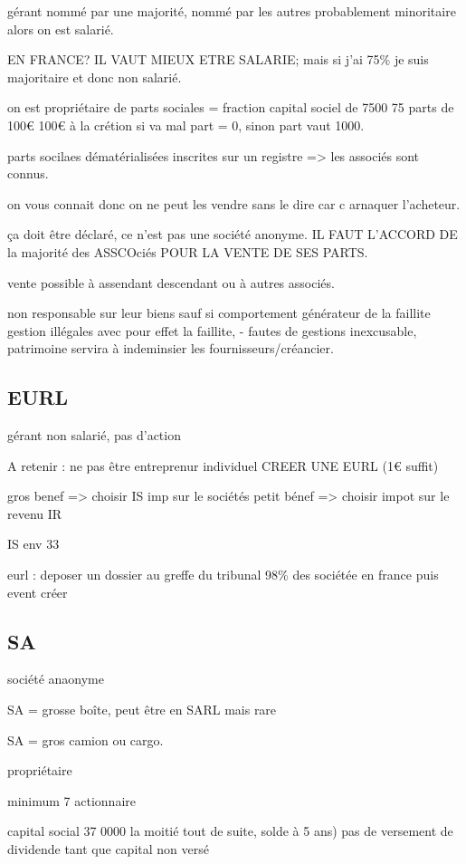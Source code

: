 \documentclass[a4paper,12pt]{article}
\begin{document}
gérant nommé par une majorité, nommé par les autres probablement minoritaire alors
on est salarié.

EN FRANCE? IL VAUT MIEUX ETRE SALARIE;
mais si j'ai 75\% je suis majoritaire et donc non salarié.

on est propriétaire de parts sociales = fraction capital sociel de 7500 75 parts de 100€
100€ à la crétion si va mal part = 0, sinon part vaut 1000.

parts socilaes dématérialisées inscrites sur un registre => les associés sont connus.

on vous connait donc on ne peut les vendre sans le dire car c arnaquer l'acheteur.

ça doit être déclaré, ce n'est pas une société anonyme.
IL FAUT L'ACCORD DE la majorité des ASSCOciés POUR LA VENTE DE SES PARTS.

vente possible à assendant descendant ou à autres associés.

non responsable sur leur biens sauf si comportement générateur de la faillite
gestion illégales avec pour effet la faillite, 
- fautes de gestions inexcusable,
patrimoine servira à indeminsier les fournisseurs/créancier.

\subsection{EURL}
gérant non salarié, pas d'action

A retenir : ne pas être entreprenur individuel CREER UNE EURL  (1€ suffit)

gros benef => choisir IS imp sur le sociétés
petit bénef => choisir impot sur le revenu IR

IS env 33%

eurl : deposer un dossier au greffe du tribunal
98\% des sociétée en france
puis event créer


\subsection{SA} société anaonyme

SA = grosse boîte, peut être en SARL mais rare

SA = gros camion ou cargo.

propriétaire

minimum 7 actionnaire

capital social 37 0000
la moitié tout de suite, solde à 5 ans) pas de versement de dividende tant que capital non versé
\end{document}
